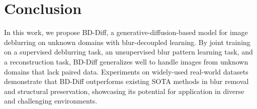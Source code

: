 \section{Conclusion}
In this work, we propose BD-Diff, a generative-diffusion-based model for image deblurring on unknown domains with blur-decoupled learning. By joint training on a supervised deblurring task, an unsupervised blur pattern learning task, and a reconstruction task, BD-Diff generalizes well to handle images from unknown domains that lack paired data. Experiments on widely-used real-world datasets demonstrate that BD-Diff outperforms existing SOTA methods in blur removal and structural preservation, showcasing its potential for application in diverse and challenging environments.


